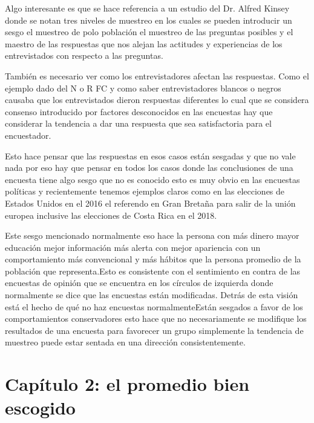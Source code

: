 \documentclass[a4paper, 11pt]{article}
\begin{document}
 Algo interesante es que se hace referencia a un estudio del Dr. Alfred Kinsey donde se notan tres niveles de muestreo en los cuales se pueden introducir un sesgo el muestreo de polo población el muestreo de las preguntas posibles y el maestro de las respuestas que nos alejan las actitudes y experiencias de los entrevistados con respecto a las preguntas.
 
 También es necesario ver como los entrevistadores afectan las respuestas. Como el ejemplo dado del N o R FC y como saber entrevistadores blancos o negros causaba que los entrevistados dieron respuestas diferentes lo cual que se considera consenso introducido por factores desconocidos en las encuestas hay que considerar la tendencia a dar una respuesta que sea satisfactoria para el encuestador.
 
 Esto hace pensar que las respuestas en esos casos están sesgadas y que no vale nada por eso hay que pensar en todos los casos donde las conclusiones de una encuesta tiene algo sesgo que no es conocido esto es muy obvio en las encuestas políticas y recientemente tenemos ejemplos claros como en las elecciones de Estados Unidos en el 2016 el referendo en Gran Bretaña para salir de la unión europea inclusive las elecciones de Costa Rica en el 2018.
 
 Este sesgo mencionado normalmente eso hace la persona con más dinero mayor educación mejor información más alerta con mejor apariencia con un comportamiento más convencional y más hábitos que la persona promedio de la población que representa.Esto es consistente con el sentimiento en contra de las encuestas de opinión que se encuentra en los círculos de izquierda donde normalmente se dice que las encuestas están modificadas. Detrás de esta visión está el hecho de qué no haz encuestas normalmenteEstán sesgados a favor de los comportamientos conservadores esto hace que no necesariamente se modifique los resultados de una encuesta para favorecer un grupo simplemente la tendencia de muestreo puede estar sentada en una dirección consistentemente.
 
\section*{Capítulo 2: el promedio bien escogido}
\end{document}
